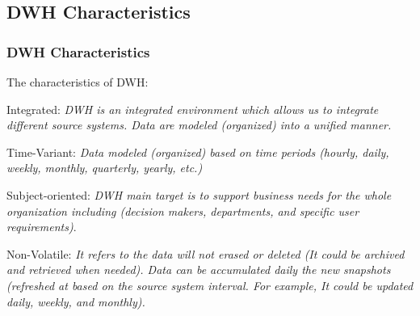 \subsection{DWH Characteristics}
\begin{frame}
\frametitle{DWH Characteristics}
\begin{wideitemize}
\item The characteristics of DWH:
	\begin{wideitemize}
		\item Integrated: \textit{DWH is an integrated environment which allows us to integrate different source systems. Data are modeled (organized) into a unified manner.} %
	
		\item Time-Variant: \textit{Data modeled (organized) based on time periods (hourly, daily, weekly, monthly, quarterly, yearly, etc.)}
	
		\item Subject-oriented: \textit{DWH main target is to support business needs for the whole organization including (decision makers, departments, and specific user requirements)}.
	
		\item Non-Volatile: \textit{It refers to the data will not erased or deleted (It could be archived and retrieved when needed). Data can be accumulated daily the new snapshots (refreshed at based on the source system interval. For example, It could be updated daily, weekly, and monthly).}
	\end{wideitemize}	
\end{wideitemize}

\end{frame}

\VideoClassification[column=2, colour=blue]

